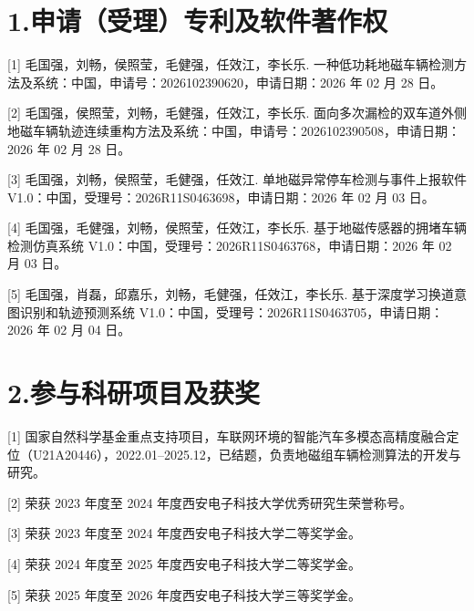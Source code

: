 
\section*{1.\quad 申请（受理）专利及软件著作权}

[1] 毛国强，刘畅，侯照莹，毛健强，任效江，李长乐. 一种低功耗地磁车辆检测方法及系统：中国，申请号：2026102390620，申请日期：2026 年 02 月 28 日。

[2] 毛国强，侯照莹，刘畅，毛健强，任效江，李长乐. 面向多次漏检的双车道外侧地磁车辆轨迹连续重构方法及系统：中国，申请号：2026102390508，申请日期：2026 年 02 月 28 日。

[3] 毛国强，刘畅，侯照莹，毛健强，任效江. 单地磁异常停车检测与事件上报软件 V1.0：中国，受理号：2026R11S0463698，申请日期：2026 年 02 月 03 日。

[4] 毛国强，毛健强，刘畅，侯照莹，任效江，李长乐. 基于地磁传感器的拥堵车辆检测仿真系统 V1.0：中国，受理号：2026R11S0463768，申请日期：2026 年 02 月 03 日。

[5] 毛国强，肖磊，邱嘉乐，刘畅，毛健强，任效江，李长乐. 基于深度学习换道意图识别和轨迹预测系统 V1.0：中国，受理号：2026R11S0463705，申请日期：2026 年 02 月 04 日。

\section*{2.\quad 参与科研项目及获奖}

[1] 国家自然科学基金重点支持项目，车联网环境的智能汽车多模态高精度融合定位（U21A20446），2022.01--2025.12，已结题，负责地磁组车辆检测算法的开发与研究。

[2] 荣获 2023 年度至 2024 年度西安电子科技大学优秀研究生荣誉称号。

[3] 荣获 2023 年度至 2024 年度西安电子科技大学二等奖学金。

[4] 荣获 2024 年度至 2025 年度西安电子科技大学二等奖学金。

[5] 荣获 2025 年度至 2026 年度西安电子科技大学三等奖学金。
